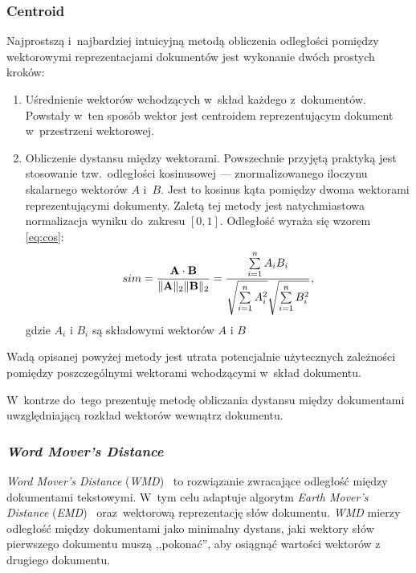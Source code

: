 \documentclass[pl]{minipw} %
\begin{document}
\subsubsection{Centroid}
Najprostszą i~najbardziej intuicyjną metodą obliczenia odległości pomiędzy wektorowymi reprezentacjami dokumentów jest wykonanie dwóch prostych kroków:
\begin{enumerate}
	\item Uśrednienie wektorów wchodzących w~skład każdego z~dokumentów. Powstały w~ten sposób wektor jest centroidem reprezentującym dokument w~przestrzeni wektorowej.
	\item Obliczenie dystansu między wektorami. Powszechnie przyjętą praktyką jest stosowanie tzw.~odległości kosinusowej --- znormalizowanego iloczynu skalarnego wektorów $A$ i~$B$. Jest to kosinus kąta pomiędzy dwoma wektorami reprezentującymi dokumenty. Zaletą tej metody jest natychmiastowa normalizacja wyniku do~zakresu $[0, 1]$. Odległość wyraża się wzorem \ref{eq:cos}:
	\begin{equation}
	\label{eq:cos}
	sim={\mathbf {A} \cdot \mathbf {B}  \over \|\mathbf {A} \|_{2}\|\mathbf {B} \|_{2}}={\frac {\sum \limits _{i=1}^{n}{A_{i}B_{i}}}{{\sqrt {\sum \limits _{i=1}^{n}{A_{i}^{2}}}}{\sqrt {\sum \limits _{i=1}^{n}{B_{i}^{2}}}}}},
	\end{equation}
	gdzie $A_i$ i $B_i$ są składowymi wektorów $A$ i $B$
\end{enumerate}
Wadą opisanej powyżej metody jest utrata potencjalnie użytecznych zależności pomiędzy poszczególnymi wektorami wchodzącymi w~skład dokumentu.

W~kontrze do~tego prezentuję metodę obliczania dystansu między dokumentami uwzględniającą rozkład wektorów wewnątrz dokumentu.

\subsubsection{\textit{Word Mover's Distance}}
\textit{Word Mover's Distance} (\textit{WMD})~\cite{wmd} to rozwiązanie zwracające odległość między dokumentami tekstowymi. W~tym celu adaptuje algorytm \textit{Earth Mover's Distance} (\textit{EMD})~\cite{emd} oraz~wektorową reprezentację słów dokumentu. \textit{WMD} mierzy odległość między dokumentami jako minimalny dystans, jaki wektory słów pierwszego dokumentu muszą ,,pokonać'', aby osiągnąć wartości wektorów z drugiego dokumentu.
\end{document}
